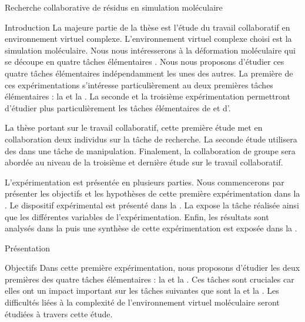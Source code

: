 \documentclass[myfrancais]{mythesis}
\begin{document}
	\begin{mychapter}{Recherche collaborative de résidus en simulation moléculaire}
		\begin{mysection}{Introduction}
			La majeure partie de la thèse est l'étude du travail collaboratif en environnement virtuel complexe.
			L'environnement virtuel complexe choisi est la simulation moléculaire.
			Nous nous intéresserons à la déformation moléculaire qui se découpe en quatre tâches élémentaires .
			Nous nous proposons d'étudier ces quatre tâches élémentaires indépendamment les unes des autres.
			La première de ces expérimentations s'intéresse particulièrement au deux premières tâches élémentaires : la  et la .
			La seconde et la troisième expérimentation permettront d'étudier plus particulièrement les tâches élémentaires de  et d'.

			La thèse portant sur le travail collaboratif, cette première étude met en collaboration deux individus sur la tâche de recherche.
			La seconde étude utilisera des  dans une tâche de manipulation.
			Finalement, la collaboration de groupe sera abordée au niveau de la troisième et dernière étude sur le travail collaboratif.

			L'expérimentation est présentée en plusieurs parties.
			Nous commencerons par présenter les objectifs et les hypothèses de cette première expérimentation dans la .
			Le dispositif expérimental est présenté dans la .
			La  expose la tâche réalisée ainsi que les différentes variables de l'expérimentation.
			Enfin, les résultats sont analysés dans la  puis une synthèse de cette expérimentation est exposée dans la .
		\end{mysection}
		\begin{mysection}{Présentation}
			\begin{mysubsection}{Objectifs}
				Dans cette première expérimentation, nous proposons d'étudier les deux premières des quatre tâches élémentaires : la  et la .
				Ces tâches sont cruciales car elles ont un impact important sur les tâches suivantes que sont la  et la .
				Les difficultés liées à la complexité de l'environnement virtuel moléculaire seront étudiées à travers cette étude.


\end{mysubsection}
\end{mysection}
\end{mychapter}
\end{document}
